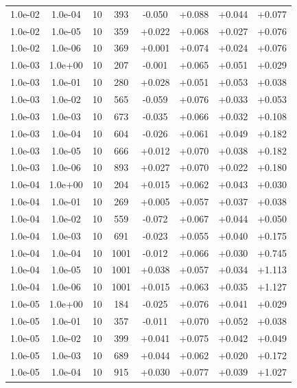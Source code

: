 \documentclass[11pt,a4paper]{article}
\begin{document}
\begin{table}[t]
{\begin{tabular}{*{8}c}
 1.0e-02 	 & 1.0e-04 	 & 10 & 393 	 & -0.050 & +0.088 & +0.044 & +0.077 \\ 
 1.0e-02 	 & 1.0e-05 	 & 10 & 359 	 & +0.022 & +0.068 & +0.027 & +0.076 \\ 
 1.0e-02 	 & 1.0e-06 	 & 10 & 369 	 & +0.001 & +0.074 & +0.024 & +0.076 \\ 
 1.0e-03 	 & 1.0e+00 	 & 10 & 207 	 & -0.001 & +0.065 & +0.051 & +0.029 \\ 
 1.0e-03 	 & 1.0e-01 	 & 10 & 280 	 & +0.028 & +0.051 & +0.053 & +0.038 \\ 
 1.0e-03 	 & 1.0e-02 	 & 10 & 565 	 & -0.059 & +0.076 & +0.033 & +0.053 \\ 
 \rowcolor{orange} 1.0e-03 	 & 1.0e-03 	 & 10 & 673 	 & -0.035 & +0.066 & +0.032 & +0.108 \\ 
 \rowcolor{orange} 1.0e-03 	 & 1.0e-04 	 & 10 & 604 	 & -0.026 & +0.061 & +0.049 & +0.182 \\ 
 \rowcolor{orange} 1.0e-03 	 & 1.0e-05 	 & 10 & 666 	 & +0.012 & +0.070 & +0.038 & +0.182 \\ 
 \rowcolor{orange} 1.0e-03 	 & 1.0e-06 	 & 10 & 893 	 & +0.027 & +0.070 & +0.022 & +0.180 \\ 
 1.0e-04 	 & 1.0e+00 	 & 10 & 204 	 & +0.015 & +0.062 & +0.043 & +0.030 \\ 
 1.0e-04 	 & 1.0e-01 	 & 10 & 269 	 & +0.005 & +0.057 & +0.037 & +0.038 \\ 
 1.0e-04 	 & 1.0e-02 	 & 10 & 559 	 & -0.072 & +0.067 & +0.044 & +0.050 \\ 
\rowcolor{orange} 1.0e-04 	 & 1.0e-03 	 & 10 & 691 	 & -0.023 & +0.055 & +0.040 & +0.175 \\ 
\rowcolor{red}  1.0e-04 	 & 1.0e-04 	 & 10 & 1001 	 & -0.012 & +0.066 & +0.030 & +0.745 \\ 
\rowcolor{red}  1.0e-04 	 & 1.0e-05 	 & 10 & 1001 	 & +0.038 & +0.057 & +0.034 & +1.113 \\ 
\rowcolor{red} 1.0e-04 	 & 1.0e-06 	 & 10 & 1001 	 & +0.015 & +0.063 & +0.035 & +1.127 \\ 
 1.0e-05 	 & 1.0e+00 	 & 10 & 184 	 & -0.025 & +0.076 & +0.041 & +0.029 \\ 
 1.0e-05 	 & 1.0e-01 	 & 10 & 357 	 & -0.011 & +0.070 & +0.052 & +0.038 \\ 
 1.0e-05 	 & 1.0e-02 	 & 10 & 399 	 & +0.041 & +0.075 & +0.042 & +0.049 \\ 
 \rowcolor{orange} 1.0e-05 	 & 1.0e-03 	 & 10 & 689 	 & +0.044 & +0.062 & +0.020 & +0.172 \\ 
\rowcolor{red} 1.0e-05 	 & 1.0e-04 	 & 10 & 915 	 & +0.030 & +0.077 & +0.039 & +1.027 \\ 

\end{tabular}}
\end{table}
\end{document}
